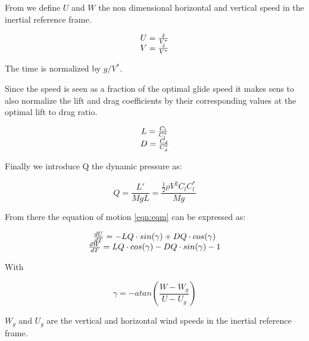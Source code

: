 \par From we define $U$ and $W$ the non dimensional horizontal and vertical speed in the inertial reference frame.

\begin{equation}
\begin{array}[c]{c}
  U = \frac{\dot{x}}{V^*} \\
  V= \frac{\dot{z}}{V^*}
\end{array}
\label{eqn:non_dim_speed}
\end{equation}

The time is normalized by $g / V^*$.

\par Since the speed is seen as a fraction of the optimal glide speed it makes sens to also normalize the lift and drag coefficients by their corresponding values at the optimal lift to drag ratio.

\begin{equation}
\begin{array}[c]{c}
  L= \frac{C_l}{C_l^*} \\
  D= \frac{C_d}{C_d^*} 
\end{array}
\label{eqn:non_dim_coef}
\end{equation}

\par Finally we introduce Q the dynamic pressure as:

\begin{equation}
Q = \frac{L'}{MgL} = \frac{\frac{1}{2} \rho V^2 C_l C_l^* }{Mg}
\label{eqn:dynamic_pressure}
\end{equation}

\par From there the equation of motion \ref{eqn:eqm} can be expressed as:

\begin{equation}
\begin{array}[c]{c}
  \frac{dU}{dT}= -LQ \cdot sin(\gamma) + DQ \cdot cos(\gamma) \\ 
  \frac{dW}{dT}= LQ \cdot cos(\gamma) - DQ \cdot sin(\gamma) - 1
\end{array}
\label{eqn:non_dim_eqm}
\end{equation}

With 

\begin{equation}
\gamma = -atan(\frac{W-W_g}{U-U_g})
\label{eqn:gamma_def}
\end{equation}

$W_g$ and $U_g$ are the vertical and horizontal wind speeds in the inertial reference frame.

